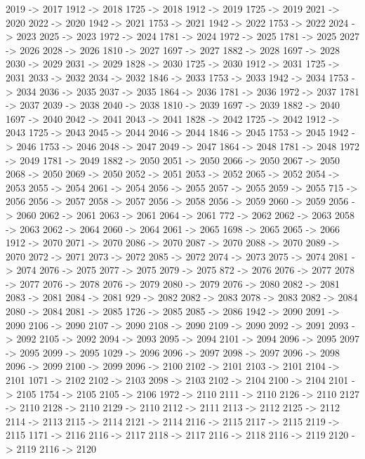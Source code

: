 {	2019 -> 2017
	1912 -> 2018
	1725 -> 2018
	1912 -> 2019
	1725 -> 2019
	2021 -> 2020
	2022 -> 2020
	1942 -> 2021
	1753 -> 2021
	1942 -> 2022
	1753 -> 2022
	2024 -> 2023
	2025 -> 2023
	1972 -> 2024
	1781 -> 2024
	1972 -> 2025
	1781 -> 2025
	2027 -> 2026
	2028 -> 2026
	1810 -> 2027
	1697 -> 2027
	1882 -> 2028
	1697 -> 2028
	2030 -> 2029
	2031 -> 2029
	1828 -> 2030
	1725 -> 2030
	1912 -> 2031
	1725 -> 2031
	2033 -> 2032
	2034 -> 2032
	1846 -> 2033
	1753 -> 2033
	1942 -> 2034
	1753 -> 2034
	2036 -> 2035
	2037 -> 2035
	1864 -> 2036
	1781 -> 2036
	1972 -> 2037
	1781 -> 2037
	2039 -> 2038
	2040 -> 2038
	1810 -> 2039
	1697 -> 2039
	1882 -> 2040
	1697 -> 2040
	2042 -> 2041
	2043 -> 2041
	1828 -> 2042
	1725 -> 2042
	1912 -> 2043
	1725 -> 2043
	2045 -> 2044
	2046 -> 2044
	1846 -> 2045
	1753 -> 2045
	1942 -> 2046
	1753 -> 2046
	2048 -> 2047
	2049 -> 2047
	1864 -> 2048
	1781 -> 2048
	1972 -> 2049
	1781 -> 2049
	1882 -> 2050
	2051 -> 2050
	2066 -> 2050
	2067 -> 2050
	2068 -> 2050
	2069 -> 2050
	2052 -> 2051
	2053 -> 2052
	2065 -> 2052
	2054 -> 2053
	2055 -> 2054
	2061 -> 2054
	2056 -> 2055
	2057 -> 2055
	2059 -> 2055
	715 -> 2056
	2056 -> 2057
	2058 -> 2057
	2056 -> 2058
	2056 -> 2059
	2060 -> 2059
	2056 -> 2060
	2062 -> 2061
	2063 -> 2061
	2064 -> 2061
	772 -> 2062
	2062 -> 2063
	2058 -> 2063
	2062 -> 2064
	2060 -> 2064
	2061 -> 2065
	1698 -> 2065
	2065 -> 2066
	1912 -> 2070
	2071 -> 2070
	2086 -> 2070
	2087 -> 2070
	2088 -> 2070
	2089 -> 2070
	2072 -> 2071
	2073 -> 2072
	2085 -> 2072
	2074 -> 2073
	2075 -> 2074
	2081 -> 2074
	2076 -> 2075
	2077 -> 2075
	2079 -> 2075
	872 -> 2076
	2076 -> 2077
	2078 -> 2077
	2076 -> 2078
	2076 -> 2079
	2080 -> 2079
	2076 -> 2080
	2082 -> 2081
	2083 -> 2081
	2084 -> 2081
	929 -> 2082
	2082 -> 2083
	2078 -> 2083
	2082 -> 2084
	2080 -> 2084
	2081 -> 2085
	1726 -> 2085
	2085 -> 2086
	1942 -> 2090
	2091 -> 2090
	2106 -> 2090
	2107 -> 2090
	2108 -> 2090
	2109 -> 2090
	2092 -> 2091
	2093 -> 2092
	2105 -> 2092
	2094 -> 2093
	2095 -> 2094
	2101 -> 2094
	2096 -> 2095
	2097 -> 2095
	2099 -> 2095
	1029 -> 2096
	2096 -> 2097
	2098 -> 2097
	2096 -> 2098
	2096 -> 2099
	2100 -> 2099
	2096 -> 2100
	2102 -> 2101
	2103 -> 2101
	2104 -> 2101
	1071 -> 2102
	2102 -> 2103
	2098 -> 2103
	2102 -> 2104
	2100 -> 2104
	2101 -> 2105
	1754 -> 2105
	2105 -> 2106
	1972 -> 2110
	2111 -> 2110
	2126 -> 2110
	2127 -> 2110
	2128 -> 2110
	2129 -> 2110
	2112 -> 2111
	2113 -> 2112
	2125 -> 2112
	2114 -> 2113
	2115 -> 2114
	2121 -> 2114
	2116 -> 2115
	2117 -> 2115
	2119 -> 2115
	1171 -> 2116
	2116 -> 2117
	2118 -> 2117
	2116 -> 2118
	2116 -> 2119
	2120 -> 2119
	2116 -> 2120
}
